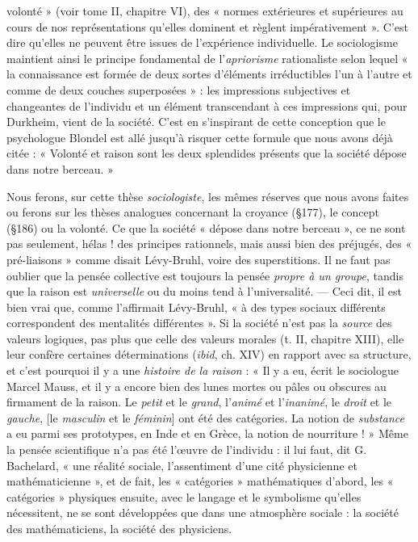 volonté » (voir tome II, chapitre VI), des « normes extérieures et
supérieures au cours de nos représentations qu’elles dominent et
règlent impérativement ». C’est dire qu’elles ne peuvent être issues de
l'expérience individuelle. Le sociologisme maintient ainsi le principe
fondamental de l’{\it apriorisme} rationaliste selon lequel « la connaissance est formée de deux sortes d'éléments irréductibles l’un à l’autre
et comme de deux couches superposées » : les impressions subjectives
et changeantes de l'individu et un élément transcendant à ces impressions qui, pour Durkheim, vient de la société. C’est en s’inspirant de
cette conception que le psychologue Blondel est allé jusqu’à risquer
cette formule que nous avons déjà citée : « Volonté et raison sont les
deux splendides présents que la société dépose dans notre berceau. »

Nous ferons, sur cette thèse {\it sociologiste}, les mêmes réserves que
nous avons faites ou ferons sur les thèses analogues concernant la
croyance (\S 177), le concept (\S 186) ou la volonté. Ce que la société
« dépose dans notre berceau », ce ne sont pas seulement, hélas ! des
principes rationnels, mais aussi bien des préjugés, des « pré-liaisons »
comme disait Lévy-Bruhl, voire des superstitions. Il ne faut pas
oublier que la pensée collective est toujours la pensée {\it propre à un
groupe}, tandis que la raison est {\it universelle} ou du moins tend à l’universalité. — Ceci dit, il est bien vrai que, comme l’affirmait Lévy-Bruhl, « à des types sociaux différents correspondent des mentalités
différentes ». Si la société n’est pas la {\it source} des valeurs logiques,
pas plus que celle des valeurs morales (t. II, chapitre XIII), elle leur
confère certaines déterminations ({\it ibid}, ch. XIV) en rapport avec sa
structure, et c’est pourquoi il y a une {\it histoire de la raison} : « Il y a eu,
écrit le sociologue Marcel Mauss, et il y a encore bien des lunes mortes
ou pâles ou obscures au firmament de la raison. Le {\it petit} et le {\it grand},
l’{\it animé} et l’{\it inanimé}, le {\it droit} et le {\it gauche}, [le {\it masculin} et le {\it féminin}]
ont été des catégories. La notion de {\it substance} a eu parmi ses prototypes, en Inde et en Grèce, la notion de nourriture ! » Même la pensée
scientifique n’a pas été l’œuvre de l'individu : il lui faut, dit G. Bachelard, « une réalité sociale, l’assentiment d’une cité physicienne et
mathématicienne », et de fait, les « catégories » mathématiques
d’abord, les « catégories » physiques ensuite, avec le langage et le
symbolisme qu’elles nécessitent, ne se sont développées que dans une
atmosphère sociale : la société des mathématiciens, la société des physiciens.

